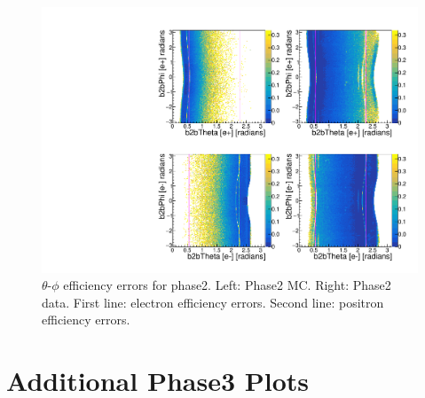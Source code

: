\documentclass[a4paper,11pt,twosided,final,german,openbib,pdftex,listof=totoc,bibliography=totoc]{scrbook}
\begin{document}
\begin{appendix}
\begin{figure}[!htbp]
	\centering
	\includegraphics[width=\textwidth]{Plots/master/xCEffTP_MCData_Error.pdf}
	\caption[$\theta$-$\phi$ Efficiency Error Plots Phase2]{$\theta$-$\phi$ efficiency errors for phase2. Left: Phase2 MC. Right: Phase2 data. First line: electron efficiency errors. Second line: positron efficiency errors.}
	\label{plt:xCEff_Error}
\end{figure}



\chapter{Additional Phase3 Plots}
\label{A:3}



\end{appendix}
\end{document}
